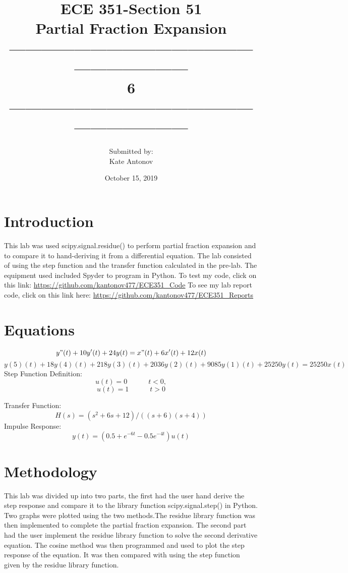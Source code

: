 \documentclass[12pt]{article}
\title{ECE 351-Section 51 \\ Partial Fraction Expansion
 \\ ------------------------------------------------------------------\\ 6 \\------------------------------------------------------------------}
\author{Submitted by: \\  Kate Antonov}
\date{October 15, 2019}
\begin{document}
\vspace{\fill}

\maketitle

\vspace{\fill}
\thispagestyle{empty}
\clearpage

\clearpage
\thispagestyle{empty}
\tableofcontents
\clearpage

\section{Introduction}
This lab was used scipy.signal.residue() to perform partial fraction expansion and to compare it to hand-deriving it from a differential equation. The lab consisted of using the step function and the transfer function calculated in the pre-lab. The equipment used included Spyder to program in Python. To test my code, click on this link: 
\url{https://github.com/kantonov477/ECE351_Code}
\newline
To see my lab report code, click on this link here: 
\url{https://github.com/kantonov477/ECE351_Reports}
\section{Equations}
\[y"(t) + 10y'(t) + 24y(t) = x"(t) + 6x'(t) + 12x(t) \]
\[y(5)(t) + 18y(4)(t) + 218y(3)(t) + 2036y(2)(t) + 9085y(1)(t) + 25250y(t) = 25250x(t)\]
Step Function Definition:
\[u(t) = 0  \hspace{3em} t < 0,\]
\[u(t) = 1  \hspace{3em} t > 0\]

Transfer Function:
\[H(s) = (s^2 + 6s + 12)/((s + 6)(s + 4))\]
Impulse Response:
\[y(t) = (0.5 + e^{-6t} - 0.5e^{-4t})u(t)\]

\section{ Methodology}
This lab was divided up into two parts, the first had the user hand derive the step response and compare it to the library function scipy.signal.step() in Python. Two graphs were plotted using the two methods.The residue library function was then implemented to complete the partial fraction expansion. The second part had the user implement the residue library function to solve the second derivative equation. The cosine method was then programmed and used to plot the step response of the equation. It was then compared with using the step function given by the residue library function.
\end{document}
